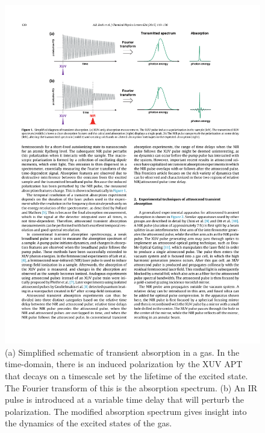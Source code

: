 \begin{figure}
	\centering
	\includegraphics[width=1.0\textwidth]{figures/Introduction/gas_TA_sketch.pdf}
	\caption[Schematic of transient absorption in a gas]{(a) Simplified schematic of transient absorption in a gas.  In the time-domain, there is an induced polarization by the XUV APT that decays on a timescale set by the lifetime of the excited state.  The Fourier transform of this is the absorption spectrum.  (b) An IR pulse is introduced at a variable time delay that will perturb the polarization.  The modified absorption spectrum gives insight into the dynamics of the excited states of the gas.}
	\label{fig:gas_TA_sketch}
\end{figure}

